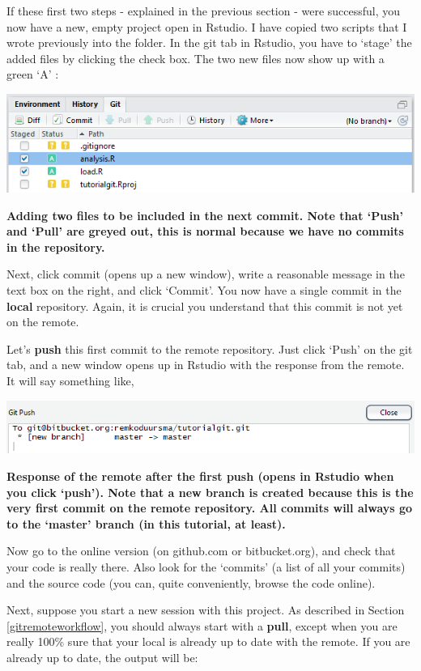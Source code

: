 \documentclass[]{book}
\begin{document}
If these first two steps - explained in the previous section - were successful, you now have a new, empty project open in Rstudio. I have copied two scripts that I wrote previously into the folder. In the git tab in Rstudio, you have to `stage' the added files by clicking the check box. The two new files now show up with a green `A' :

\includegraphics[width=0.75\linewidth]{screenshots/session2stage1}

\textbf{Adding two files to be included in the next commit. Note that `Push' and `Pull' are greyed out, this is normal because we have no commits in the repository.}

Next, click commit (opens up a new window), write a reasonable message in the text box on the right, and click `Commit'. You now have a single commit in the \textbf{local} repository. Again, it is crucial you understand that this commit is not yet on the remote.

Let's \textbf{push} this first commit to the remote repository. Just click `Push' on the git tab, and a new window opens up in Rstudio with the response from the remote. It will say something like,

\includegraphics[width=0.75\linewidth]{screenshots/session2firstpush}

\textbf{Response of the remote after the first push (opens in Rstudio when you click `push'). Note that a new branch is created because this is the very first commit on the remote repository. All commits will always go to the `master' branch (in this tutorial, at least).}

Now go to the online version (on github.com or bitbucket.org), and check that your code is really there. Also look for the `commits' (a list of all your commits) and the source code (you can, quite conveniently, browse the code online).

Next, suppose you start a new session with this project. As described in Section \ref{gitremoteworkflow}, you should always start with a \textbf{pull}, except when you are really 100\% sure that your local is already up to date with the remote. If you are already up to date, the output will be:
\end{document}
